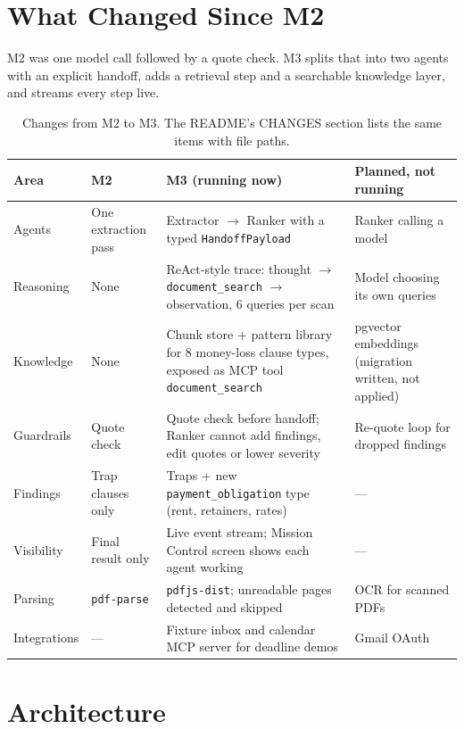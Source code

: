 \documentclass[11pt,letterpaper]{article}
\newcommand{\code}[1]{\texttt{#1}}
\begin{document}
\section{What Changed Since M2}

M2 was one model call followed by a quote check. M3 splits that into two agents with an explicit handoff, adds a retrieval step and a searchable knowledge layer, and streams every step live.

\begin{table}[htbp]
\centering
\small
\begin{tabularx}{\textwidth}{@{}p{2.1cm}LLL@{}}
\toprule
\textbf{Area} & \textbf{M2} & \textbf{M3 (running now)} & \textbf{Planned, not running} \\
\midrule
Agents & One extraction pass & Extractor $\rightarrow$ Ranker with a typed \code{HandoffPayload} & Ranker calling a model \\
Reasoning & None & ReAct-style trace: thought $\rightarrow$ \code{document\_search} $\rightarrow$ observation, 6 queries per scan & Model choosing its own queries \\
Knowledge & None & Chunk store + pattern library for 8 money-loss clause types, exposed as MCP tool \code{document\_search} & pgvector embeddings (migration written, not applied) \\
Guardrails & Quote check & Quote check before handoff; Ranker cannot add findings, edit quotes or lower severity & Re-quote loop for dropped findings \\
Findings & Trap clauses only & Traps + new \code{payment\_obligation} type (rent, retainers, rates) & --- \\
Visibility & Final result only & Live event stream; Mission Control screen shows each agent working & --- \\
Parsing & \code{pdf-parse} & \code{pdfjs-dist}; unreadable pages detected and skipped & OCR for scanned PDFs \\
Integrations & --- & Fixture inbox and calendar MCP server for deadline demos & Gmail OAuth \\
\bottomrule
\end{tabularx}
\caption{Changes from M2 to M3. The README's CHANGES section lists the same items with file paths.}
\end{table}

\section{Architecture}
\end{document}
